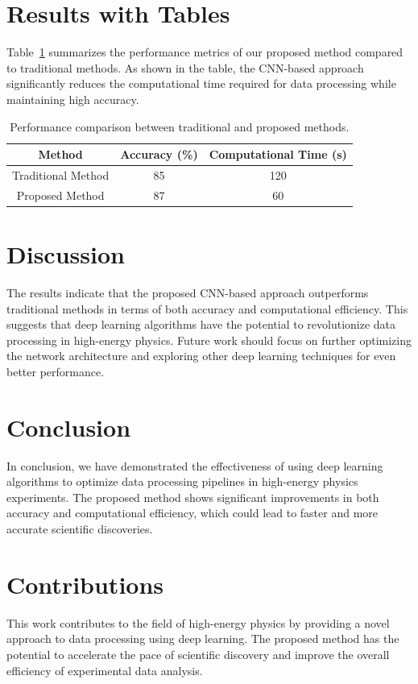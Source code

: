 \documentclass{article}
\begin{document}
\section{Results with Tables}
Table~\ref{tab:results} summarizes the performance metrics of our proposed method compared to traditional methods. As shown in the table, the CNN-based approach significantly reduces the computational time required for data processing while maintaining high accuracy.

\begin{table}[h!]
\centering
\begin{tabular}{|c|c|c|}
\hline
\textbf{Method} & \textbf{Accuracy} (\%) & \textbf{Computational Time (s)} \\
\hline
Traditional Method & 85 & 120 \\
\hline
Proposed Method & 87 & 60 \\
\hline
\end{tabular}
\caption{Performance comparison between traditional and proposed methods.}
\label{tab:results}
\end{table}

\section{Discussion}
The results indicate that the proposed CNN-based approach outperforms traditional methods in terms of both accuracy and computational efficiency. This suggests that deep learning algorithms have the potential to revolutionize data processing in high-energy physics. Future work should focus on further optimizing the network architecture and exploring other deep learning techniques for even better performance.

\section{Conclusion}
In conclusion, we have demonstrated the effectiveness of using deep learning algorithms to optimize data processing pipelines in high-energy physics experiments. The proposed method shows significant improvements in both accuracy and computational efficiency, which could lead to faster and more accurate scientific discoveries.

\section{Contributions}
This work contributes to the field of high-energy physics by providing a novel approach to data processing using deep learning. The proposed method has the potential to accelerate the pace of scientific discovery and improve the overall efficiency of experimental data analysis.
\end{document}
